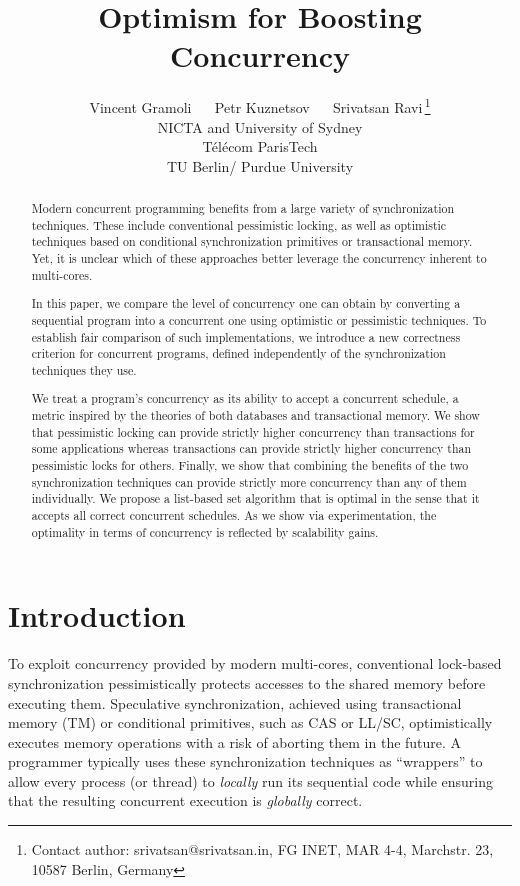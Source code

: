 \documentclass[11pt,pdftex,letterpaper]{article}
\begin{document}
\title{Optimism for Boosting Concurrency}
\author{
Vincent Gramoli\,~~~Petr Kuznetsov\,~~~Srivatsan Ravi\,\thanks{Contact author:
          srivatsan@srivatsan.in, FG INET, MAR 4-4, Marchstr. 23,
          10587 Berlin, Germany}\\
\small  NICTA and University of Sydney\\
\small  T\'el\'ecom ParisTech\\
\small  TU Berlin/ Purdue University
}

\date{}\maketitle
\thispagestyle{empty}

\begin{abstract}
Modern concurrent programming benefits from a large variety of synchronization techniques.
These include conventional pessimistic locking, as well as optimistic
techniques based on conditional synchronization primitives or 
transactional memory. Yet, it is unclear which of these approaches 
better leverage the concurrency inherent to multi-cores.


In this paper, we compare the level of concurrency one can obtain by converting a 
sequential program into a concurrent one using optimistic or
pessimistic techniques. 
To establish fair comparison of such implementations, we 
introduce a new correctness
criterion for concurrent programs, defined independently 
of the synchronization techniques they use. 

We treat a program's concurrency as its ability to accept a
concurrent schedule, a metric inspired by the theories of both databases
and transactional memory. We show that pessimistic locking can
provide strictly higher concurrency than transactions for some
applications whereas transactions can provide strictly higher
concurrency than pessimistic locks for others. 
Finally, we show that combining the benefits of the two synchronization techniques 
can provide  strictly more concurrency than any of them individually.
We propose a list-based set algorithm that is optimal in the sense that it accepts all
correct concurrent schedules.
As we show via experimentation, the optimality in terms of concurrency is
reflected by scalability gains.      
\end{abstract}


\newpage
{}\setcounter{page}{1}
\section{Introduction}
\label{sec:intro}
To exploit concurrency provided by modern multi-cores, conventional lock-based synchronization 
pessimistically protects accesses to  the shared memory before
executing them.
Speculative synchronization, achieved using transactional memory (TM) or
conditional primitives, such as CAS or LL/SC,  
optimistically executes memory operations with a risk of aborting them in the future.
A programmer typically uses these synchronization techniques 
as ``wrappers'' to allow every process (or thread) to \emph{locally} run its sequential code while ensuring 
that the resulting concurrent execution is \emph{globally} correct.
\end{document}
